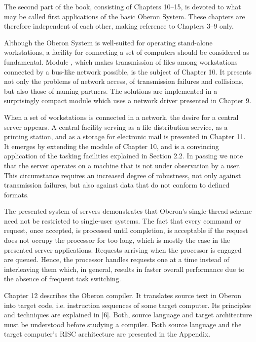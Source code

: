 The second part of the book, consisting of Chapters 10--15, is
devoted to what may be called first applications of the basic Oberon
System. These chapters are therefore independent of each other, making
reference to Chapters 3--9 only.

Although the Oberon System is well-suited for operating stand-alone
workstations, a facility for connecting a set of computers should be
considered as fundamental. Module , which makes transmission of
files among workstations connected by a bus-like network possible, is
the subject of Chapter 10. It presents not only the problems of
network access, of transmission failures and collisions, but also
those of naming partners. The solutions are implemented in a
surprisingly compact module which uses a network driver presented in
Chapter 9.

When a set of workstations is connected in a network, the desire for a
central server appears. A central facility serving as a file
distribution service, as a printing station, and as a storage for
electronic mail is presented in Chapter 11. It emerges by extending
the  module of Chapter 10, and is a convincing application of the
tasking facilities explained in Section 2.2. In passing we note that
the server operates on a machine that is not under observation by a
user. This circumstance requires an increased degree of robustness,
not only against transmission failures, but also against data that do
not conform to defined formats.

The presented system of servers demonstrates that Oberon's
single-thread scheme need not be restricted to single-user
systems. The fact that every command or request, once accepted, is
processed until completion, is acceptable if the request does not
occupy the processor for too long, which is mostly the case in the
presented server applications. Requests arriving when the processor is
engaged are queued. Hence, the processor handles requests one at a
time instead of interleaving them which, in general, results in faster
overall performance due to the absence of frequent task switching.

Chapter 12 describes the Oberon compiler. It translates source text in
Oberon into target code, i.e. instruction sequences of some target
computer. Its principles and techniques are explained in [6]. Both,
source language and target architecture must be understood before
studying a compiler. Both source language and the target computer's
RISC architecture are presented in the Appendix.

